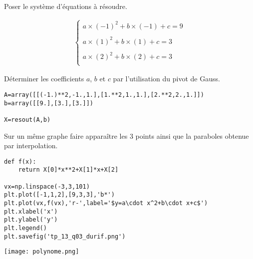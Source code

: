 \exer{[polynome]}
\setcounter{numques}{0}~\\

\question{} Poser le système d'équations à résoudre.

\begin{align*}
\left\{
\begin{array}{l}
a\times(-1)^2+b\times (-1)+c=9\\
\\
a\times(1)^2+b\times (1)+c=3\\
\\
a\times(2)^2+b\times (2)+c=3\\
\end{array}
\right.
\end{align*}

\question{} Déterminer les coefficients $a$, $b$ et $c$ par l'utilisation du pivot de Gauss.

\begin{lstlisting}
A=array([[(-1.)**2,-1.,1.],[1.**2,1.,1.],[2.**2,2.,1.]])
b=array([[9.],[3.],[3.]])

X=resout(A,b)
\end{lstlisting}

\question{} Sur un même graphe faire apparaître les 3 points ainsi que la paraboles obtenue par interpolation.
\begin{lstlisting}
def f(x):
    return X[0]*x**2+X[1]*x+X[2]

vx=np.linspace(-3,3,101)
plt.plot([-1,1,2],[9,3,3],'b*')
plt.plot(vx,f(vx),'r-',label='$y=a\cdot x^2+b\cdot x+c$')
plt.xlabel('x')
plt.ylabel('y')
plt.legend()
plt.savefig('tp_13_q03_durif.png')
\end{lstlisting}

\begin{center}
\texttt{[image: polynome.png]}
\end{center}